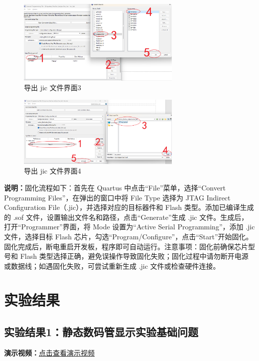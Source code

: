 \documentclass[UTF8]{article}
\theoremstyle{MyLineTheoremStyle} %
\theoremstyle{MyBlockTheoremStyle} %
\theoremstyle{MySubsubsectionStyle} %
\begin{document}
\begin{enumerate}
    \begin{figure}[H]
        \centering
        \includegraphics[width=0.7\textwidth]{step10_3.png}
        \caption{导出 jic 文件界面3}
        \label{fig:step10_3}
    \end{figure}

    \begin{figure}[H]
        \centering
        \includegraphics[width=0.7\textwidth]{step10_4.png}
        \caption{导出 jic 文件界面4}
        \label{fig:step10_4}
    \end{figure}

    \textbf{说明：}固化流程如下：首先在 Quartus 中点击“File”菜单，选择“Convert Programming Files”，在弹出的窗口中将 File Type 选择为 JTAG Indirect Configuration File（.jic），并选择对应的目标器件和 Flash 类型。添加已编译生成的 .sof 文件，设置输出文件名和路径，点击“Generate”生成 .jic 文件。生成后，打开“Programmer”界面，将 Mode 设置为“Active Serial Programming”，添加 .jic 文件，选择目标 Flash 芯片，勾选“Program/Configure”，点击“Start”开始固化。固化完成后，断电重启开发板，程序即可自动运行。注意事项：固化前确保芯片型号和 Flash 类型选择正确，避免误操作导致固化失败；固化过程中请勿断开电源或数据线；如遇固化失败，可尝试重新生成 .jic 文件或检查硬件连接。
\end{enumerate}




\cleardoublepage

\section{实验结果}

\subsection{实验结果1：静态数码管显示实验基础问题}
\noindent
\textbf{演示视频：}\href{https://www.bilibili.com/video/BV18iVRzWEar?vd_source=4fd6c4265e65c0785c912874692a3971}{点击查看演示视频}
\end{document}
